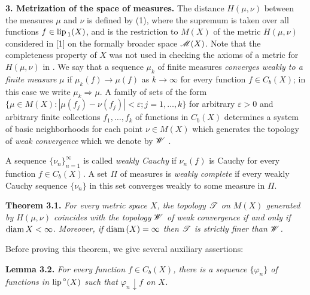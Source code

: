 \documentclass[11pt,a4paper]{article}
\begin{document}
\vspace{2em}
{\bf 3. Metrization of the space of measures.} %
The distance $H(\mu,\nu)$ between the measures $\mu$ and $\nu$ is defined by (1),
where the supremum is taken over all functions $f\in{\rm lip\,}_1(X)$,
and is the restriction to $M(X)$ of the metric $H(\mu,\nu)$ considered in [1]
on the formally broader space ${\cal M}(X)$.
Note that the completeness property of $X$ was not used in
checking the axioms of a metric for $H(\mu,\nu)$ in \cite[Theorem 1, p. 161]{Ak}.
We say that a sequence $\mu_k$ of finite measures
{\it converges weakly to a finite measure} $\mu$
if $\mu_k(f)\to\mu(f)$ as $k\to\infty$ for every function $f\in C_b(X)$;
in this case we write $\mu_k\Rightarrow\mu$. A family of sets of the form
$\{\mu\in M(X): |\mu(f_j)-\nu(f_j)|<\varepsilon; j=1,\ldots,k\}$
for arbitrary $\varepsilon>0$ and arbitrary finite collections
$f_1,\ldots,f_k$
of functions in $C_b(X)$ determines a system of basic neighborhoods
for each point $\nu\in M(X)$
which generates the topology of {\it weak convergence} which we denote by ${\cal W}$ .

A sequence $\{\nu_n\}_{n=1}^{\infty}$
is called {\it weakly Cauchy} if $\nu_n(f)$ is Cauchy for every function
$f\in C_b(X)$. A set $\Pi$ of measures is {\it weakly complete} if
every weakly Cauchy sequence $\{\nu_n\}$ in this set converges weakly to
some measure in $\Pi$.


\filbreak %
{\bf Theorem 3.1.} \sl
For every metric space $X$, the topology ${\cal T}$
on $M(X)$ generated by $H(\mu,\nu)$
coincides with the topology ${\cal W}$ of weak convergence if and only
if ${\rm diam\,} X<\infty$. Moreover, if ${\rm diam\,}(X)=\infty$
then ${\cal T}$ is strictly finer than ${\cal W}$. \rm
\vspace{1em}

Before proving this theorem, we give several auxiliary assertions:

\vspace{1em} {\bf Lemma 3.2.} \sl %
For every function $f\in C_b(X)$,
there is a sequence $\{\varphi_n\}$ of functions in
${\rm lip\,}^{\circ}(X)$ such that $\varphi_n\downarrow f$ on $X$. \rm
\vspace{1em}
\end{document}

